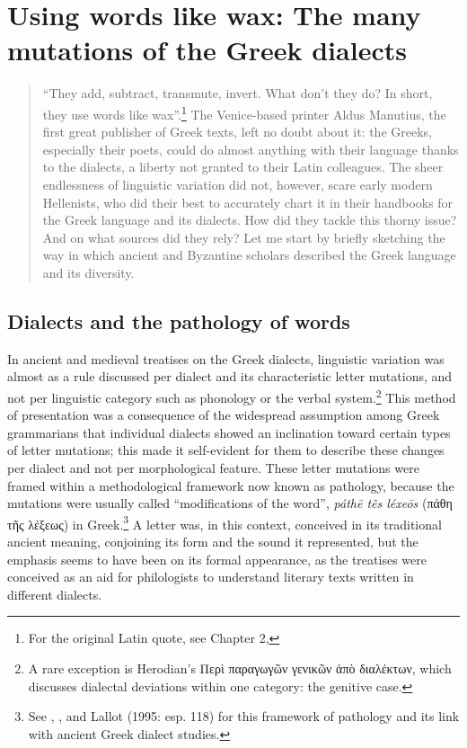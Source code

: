 \chapter{Using words like wax: The many mutations of the Greek dialects}
\begin{quote}
“They add, subtract, transmute, invert. What don’t they do? In short, they use words like wax”.\footnote{{For the original Latin quote, see Chapter 2, }} The Venice-based printer Aldus Manutius, the first great publisher of Greek texts, left no doubt about it: the Greeks, especially their poets, could do almost anything with their language thanks to the dialects, a liberty not granted to their Latin colleagues. The sheer endlessness of linguistic variation did not, however, scare early modern Hellenists, who did their best to accurately chart it in their handbooks for the Greek language and its dialects. How did they tackle this thorny issue? And on what sources did they rely? Let me start by briefly sketching the way in which ancient and Byzantine scholars described the Greek language and its diversity.
\end{quote}

\section{Dialects and the pathology of words}

In ancient and medieval treatises on the Greek dialects, linguistic variation was almost as a rule discussed per dialect and its characteristic letter mutations, and not per linguistic category such as phonology or the verbal system.\footnote{{A rare exception is Herodian’s Περὶ παραγωγῶν γενικῶν ἀπὸ διαλέκτων, which discusses dialectal deviations within one category: the genitive case.}} This method of presentation was a consequence of the widespread assumption among Greek grammarians that individual dialects showed an inclination toward certain types of letter mutations; this made it self-evident for them to describe these changes per dialect and not per morphological feature. These letter mutations were framed within a methodological framework now known as pathology, because the mutations were usually called “modifications of the word”, \textit{páthē tês léxeōs} (πάθη τῆς λέξεως) in Greek.\footnote{{See \citet{Wackernagel1876}, \citet[150]{Siebenborn1976}, and Lallot (1995: esp. 118) for this framework of pathology and its link with ancient Greek dialect studies.}} A letter was, in this context, conceived in its traditional ancient meaning, conjoining its form and the sound it represented, but the emphasis seems to have been on its formal appearance, as the treatises were conceived as an aid for philologists to understand literary texts written in different dialects.



